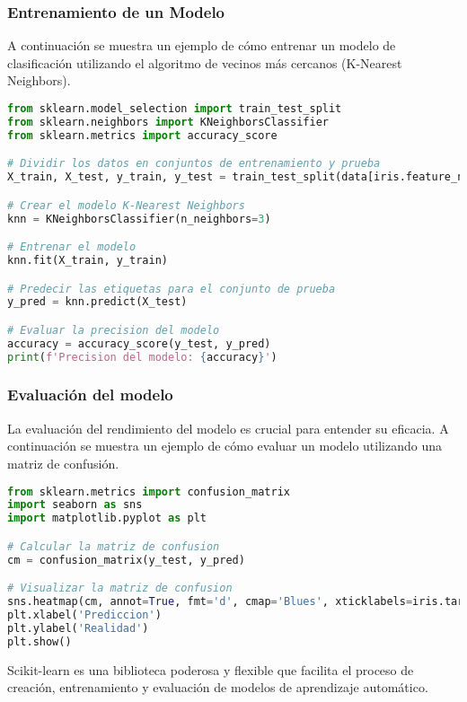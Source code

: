 \documentclass[conference]{IEEEtran}
\begin{document}
	\subsubsection{Entrenamiento de un Modelo}
	A continuación se muestra un ejemplo de cómo entrenar 
	un modelo de clasificación utilizando el algoritmo 
	de vecinos más cercanos (K-Nearest Neighbors).
	\begin{lstlisting}[language=Python, caption=Entrenamiento de un Modelo de K-Nearest Neighbors]
from sklearn.model_selection import train_test_split
from sklearn.neighbors import KNeighborsClassifier
from sklearn.metrics import accuracy_score

# Dividir los datos en conjuntos de entrenamiento y prueba
X_train, X_test, y_train, y_test = train_test_split(data[iris.feature_names], data['target'], test_size=0.2, random_state=42)

# Crear el modelo K-Nearest Neighbors
knn = KNeighborsClassifier(n_neighbors=3)

# Entrenar el modelo
knn.fit(X_train, y_train)

# Predecir las etiquetas para el conjunto de prueba
y_pred = knn.predict(X_test)

# Evaluar la precision del modelo
accuracy = accuracy_score(y_test, y_pred)
print(f'Precision del modelo: {accuracy}')
	\end{lstlisting}
	\subsubsection{Evaluación del modelo}
	La evaluación del rendimiento del modelo es crucial para entender su eficacia. A continuación se muestra 
	un ejemplo de cómo evaluar un modelo utilizando una matriz de confusión.
	\begin{lstlisting}[language=Python, caption=Evaluación del Modelo con Matriz de Confusión]
from sklearn.metrics import confusion_matrix
import seaborn as sns
import matplotlib.pyplot as plt

# Calcular la matriz de confusion
cm = confusion_matrix(y_test, y_pred)

# Visualizar la matriz de confusion
sns.heatmap(cm, annot=True, fmt='d', cmap='Blues', xticklabels=iris.target_names, yticklabels=iris.target_names)
plt.xlabel('Prediccion')
plt.ylabel('Realidad')
plt.show()
	\end{lstlisting}
	Scikit-learn es una biblioteca poderosa y flexible que facilita 
	el proceso de creación, entrenamiento y evaluación de modelos de 
	aprendizaje automático.
\end{document}

